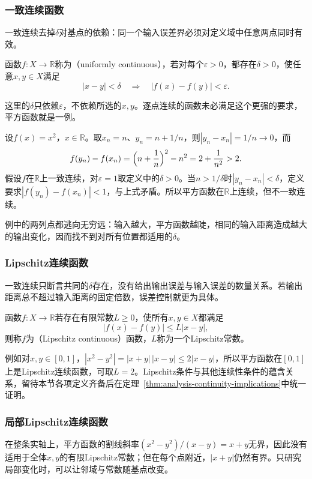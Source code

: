 \subsubsection{一致连续函数}
一致连续去掉$\delta$对基点的依赖：同一个输入误差界必须对定义域中任意两点同时有效。
\begin{definition}[一致连续函数]
\label{def:analysis-uniform-continuity}
函数$f:X\to\mathbb R$称为（uniformly continuous），若对每个$\varepsilon>0$，都存在$\delta>0$，使任意$x,y\in X$满足
\[
 |x-y|<\delta\quad\Longrightarrow\quad |f(x)-f(y)|<\varepsilon.
\]
\end{definition}
这里的$\delta$只依赖$\varepsilon$，不依赖所选的$x,y$。逐点连续的函数未必满足这个更强的要求，平方函数就是一例。
\begin{example}[平方函数在实轴上不一致连续]
\label{ex:analysis-square-not-uniformly-continuous}
设$f(x)=x^2$，$x\in\mathbb R$。取$x_n=n$、$y_n=n+1/n$，则$|y_n-x_n|=1/n\to0$，而
\[
 f(y_n)-f(x_n)=\Bigl(n+\frac1n\Bigr)^2-n^2=2+\frac1{n^2}>2.
\]
假设$f$在$\mathbb R$上一致连续，对$\varepsilon=1$取定义中的$\delta>0$。当$n>1/\delta$时$|y_n-x_n|<\delta$，定义要求$|f(y_n)-f(x_n)|<1$，与上式矛盾。所以平方函数在$\mathbb R$上连续，但不一致连续。
\end{example}
例中的两列点都逃向无穷远：输入越大，平方函数越陡，相同的输入距离造成越大的输出变化，因而找不到对所有位置都适用的$\delta$。

\subsubsection{Lipschitz连续函数}
一致连续只断言共同的$\delta$存在，没有给出输出误差与输入误差的数量关系。若输出距离总不超过输入距离的固定倍数，误差控制就更为具体。
\begin{definition}[Lipschitz连续函数]
\label{def:analysis-lipschitz-continuity}
函数$f:X\to\mathbb R$若存在有限常数$L\geq0$，使所有$x,y\in X$都满足
\begin{equation}
 |f(x)-f(y)|\leq L|x-y|,
\label{eq:analysis-lipschitz-condition}
\end{equation}
则称$f$为（Lipschitz continuous）函数，$L$称为一个Lipschitz常数。
\end{definition}
例如对$x,y\in[0,1]$，$|x^2-y^2|=|x+y|\,|x-y|\leq2|x-y|$，所以平方函数在$[0,1]$上是Lipschitz连续函数，可取$L=2$。Lipschitz条件与其他连续性条件的蕴含关系，留待本节各项定义齐备后在定理~\ref{thm:analysis-continuity-implications}中统一证明。

\subsubsection{局部Lipschitz连续函数}
在整条实轴上，平方函数的割线斜率$(x^2-y^2)/(x-y)=x+y$无界，因此没有适用于全体$x,y$的有限Lipschitz常数；但在每个点附近，$|x+y|$仍然有界。只研究局部变化时，可以让邻域与常数随基点改变。


